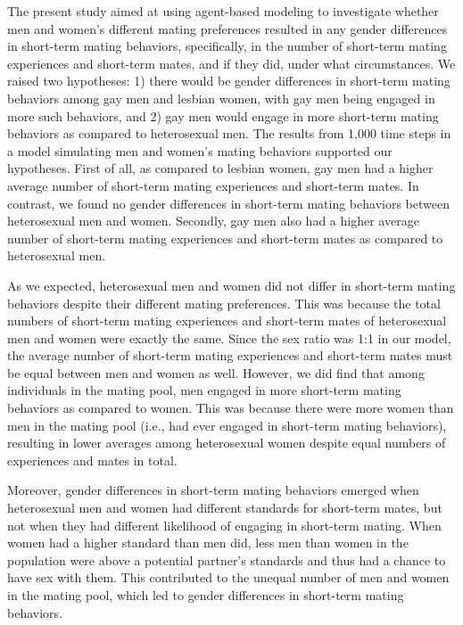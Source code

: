\documentclass[
  11pt,
]{article}
\begin{document}
The present study aimed at using agent-based modeling to investigate
whether men and women's different mating preferences resulted in any
gender differences in short-term mating behaviors, specifically, in the
number of short-term mating experiences and short-term mates, and if
they did, under what circumstances. We raised two hypotheses: 1) there
would be gender differences in short-term mating behaviors among gay men
and lesbian women, with gay men being engaged in more such behaviors,
and 2) gay men would engage in more short-term mating behaviors as
compared to heterosexual men. The results from 1,000 time steps in a
model simulating men and women's mating behaviors supported our
hypotheses. First of all, as compared to lesbian women, gay men had a
higher average number of short-term mating experiences and short-term
mates. In contrast, we found no gender differences in short-term mating
behaviors between heterosexual men and women. Secondly, gay men also had
a higher average number of short-term mating experiences and short-term
mates as compared to heterosexual men.

As we expected, heterosexual men and women did not differ in short-term
mating behaviors despite their different mating preferences. This was
because the total numbers of short-term mating experiences and
short-term mates of heterosexual men and women were exactly the same.
Since the sex ratio was 1:1 in our model, the average number of
short-term mating experiences and short-term mates must be equal between
men and women as well. However, we did find that among individuals in
the mating pool, men engaged in more short-term mating behaviors as
compared to women. This was because there were more women than men in
the mating pool (i.e., had ever engaged in short-term mating behaviors),
resulting in lower averages among heterosexual women despite equal
numbers of experiences and mates in total.

Moreover, gender differences in short-term mating behaviors emerged when
heterosexual men and women had different standards for short-term mates,
but not when they had different likelihood of engaging in short-term
mating. When women had a higher standard than men did, less men than
women in the population were above a potential partner's standards and
thus had a chance to have sex with them. This contributed to the unequal
number of men and women in the mating pool, which led to gender
differences in short-term mating behaviors.
\end{document}
